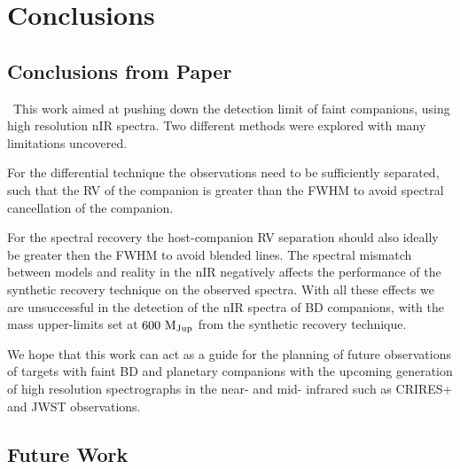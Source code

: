 
\chapter{Conclusions}  %

\label{cha:conclusions} 


\section{Conclusions from Paper}
\label{sec:conclusions}
\
This work aimed at pushing down the detection limit of faint companions, using high resolution nIR spectra. Two different methods were explored with many limitations uncovered. 
\unfinished{Update from paper}

For the differential technique the observations need to be sufficiently separated, such that the RV of the companion is greater than the FWHM to avoid spectral cancellation of the companion.
	
	For the spectral recovery the host-companion RV separation should also ideally be greater then the FWHM to avoid blended lines. The spectral mismatch between models and reality in the nIR negatively affects the performance of the synthetic recovery technique on the observed spectra. With all these effects we are unsuccessful in the detection of the nIR spectra of BD companions,  with the mass upper-limits set at \(\rm 600~M_{Jup}\) from the synthetic recovery technique.

We hope that this work can act as a guide for the planning of future observations of targets with faint BD and planetary companions with the upcoming generation of high resolution spectrographs in the near- and mid- infrared such as CRIRES+ and JWST observations.



\section{Future Work}
